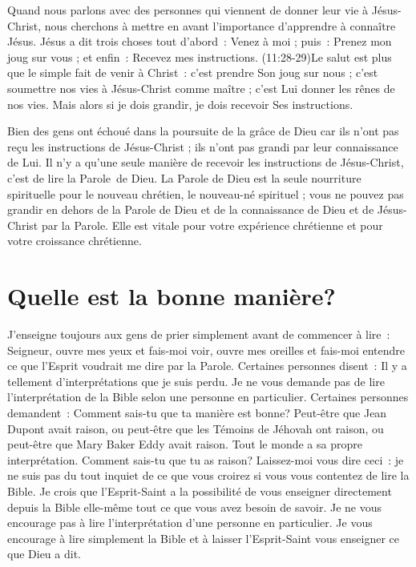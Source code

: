 Quand nous parlons avec des personnes qui viennent de donner leur vie
 à Jésus-Christ, nous cherchons à mettre en avant l'im\-por\-tance d'apprendre
 à connaître Jésus. Jésus a dit trois choses \ocadr tout d'abord~:
 \Og Venez à moi \Fg{} ; puis~: \Og Prenez mon joug sur vous \Fg{} ;
 et enfin~: \Og Recevez mes instructions. \Fg{}
 (11:28-29)Le salut est plus que le simple fait
 de venir à Christ~:
 c'est prendre Son joug sur nous ;
 c'est soumettre nos vies à Jésus-Christ comme maître ;
 c'est Lui donner les rênes de nos vies.
 Mais alors si je dois grandir, je dois recevoir Ses instructions.

Bien des gens ont échoué dans la poursuite de la grâce de Dieu
 car ils n'ont pas reçu les instructions de Jésus-Christ ;
 ils n'ont pas grandi par leur connaissance de Lui.
 Il n'y a qu'une seule manière de recevoir les instructions de Jésus-Christ,
 c'est de lire la Parole~de Dieu.
 La Parole de Dieu est la seule nourriture spirituelle pour le nouveau
 chrétien, le nouveau-né spirituel ; vous ne pouvez pas grandir en dehors
 de la Parole de Dieu et de la connaissance de Dieu et de Jésus-Christ
 par la Parole.
 Elle est vitale pour votre expérience  chrétienne
 et pour votre croissance chrétienne.


\section{Quelle est la bonne mani\`ere?}

J'enseigne toujours aux gens de prier simplement
 avant de commencer à lire~:
 \Og Seigneur, ouvre mes yeux et fais-moi voir,
 ouvre mes oreilles et fais-moi entendre ce que l'Esprit
 voudrait me dire par la Parole. \Fg{}
 Certaines personnes disent~:
 \Og Il y a tellement d'in\-ter\-pré\-ta\-tions que je suis perdu. \Fg{}
 Je ne vous demande pas de lire l'interprétation de la Bible
 selon une personne en particulier.
 Certaines personnes demandent~:
 \Og Comment sais-tu que ta manière est bonne? Peut-être que Jean Dupont
 avait raison, ou peut-être que les Témoins de Jéhovah ont raison,
 ou peut-être que Mary Baker Eddy avait raison.
 Tout le monde a sa propre interprétation.
 Comment sais-tu que tu as raison? \Fg{}
 Laissez-moi vous dire ceci~: je ne suis pas du tout inquiet
 de ce que vous croirez si vous vous contentez de lire la Bible.
 Je crois que l'Esprit-Saint a la possibilité de vous enseigner
 \ocadr directement depuis la Bible elle-même \fcadr{}
 tout ce que vous avez besoin de savoir.
 Je ne vous encourage pas à lire l'interprétation d'une personne
 en particulier. Je vous encourage à lire simplement la Bible
 et à laisser l'Esprit-Saint vous enseigner ce que Dieu a dit.

